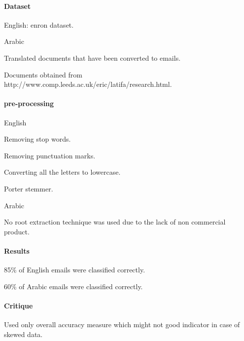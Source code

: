 \documentclass[12pt]{article}
\newenvironment{my_itemize}
{\begin{itemize}
  \setlength{\itemsep}{0cm}
  \setlength{\parskip}{0cm}}
{\end{itemize}}
\begin{document}
\paragraph{Dataset}
\begin{my_itemize}
    \item English: enron dataset.
    \item Arabic
    \begin{my_itemize}
        \item Translated documents that have been converted to emails.
        \item Documents obtained from http://www.comp.leeds.ac.uk/eric/latifa/research.html.
    \end{my_itemize}
\end{my_itemize}

\paragraph{pre-processing}
\begin{my_itemize}
    \item English
    \begin{my_itemize}
        \item Removing stop words.
        \item Removing punctuation marks.
        \item Converting all the letters to lowercase.
        \item Porter stemmer.
    \end{my_itemize}
    \item Arabic
    \begin{my_itemize}
        \item No root extraction technique was used due to the lack of non commercial product.
    \end{my_itemize}
\end{my_itemize}

\paragraph{Results}
\begin{my_itemize}
    \item 85\% of English emails were classified correctly.
    \item 60\% of Arabic emails were classified correctly.
\end{my_itemize}

\paragraph{Critique}
\begin{my_itemize}
    \item Used only overall accuracy measure which might not good indicator in case of skewed data.
\end{my_itemize}
\end{document}
